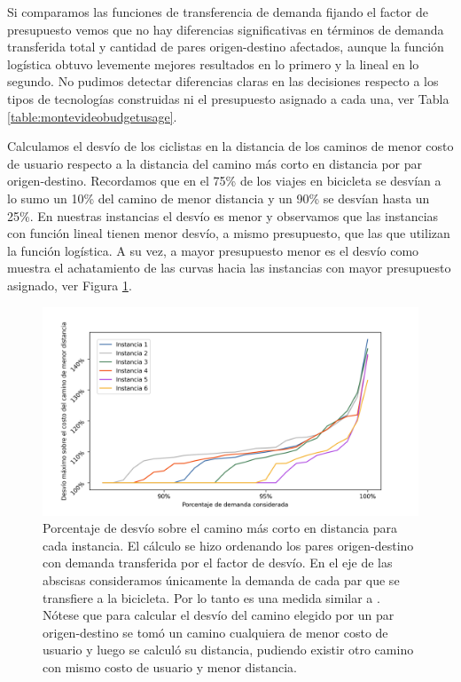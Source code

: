 \FloatBarrier
Si comparamos las funciones de transferencia de demanda fijando el factor de presupuesto vemos que no hay diferencias significativas en términos de demanda transferida total y cantidad de pares origen-destino afectados, aunque la función logística obtuvo levemente mejores resultados en lo primero y la lineal en lo segundo. No pudimos detectar diferencias claras en las decisiones respecto a los tipos de tecnologías construidas ni el presupuesto asignado a cada una, ver Tabla \ref{table:montevideobudgetusage}.

Calculamos el desvío de los ciclistas en la distancia de los caminos de menor costo de usuario respecto a la distancia del camino más corto en distancia por par origen-destino. Recordamos que en \textcite{winters2010} el 75\% de los viajes en bicicleta se desvían a lo sumo un 10\% del camino de menor distancia y un 90\% se desvían hasta un 25\%. En nuestras instancias el desvío es menor y observamos que las instancias con función lineal tienen menor desvío, a mismo presupuesto, que las que utilizan la función logística. A su vez, a mayor presupuesto menor es el desvío como muestra el achatamiento de las curvas hacia las instancias con mayor presupuesto asignado, ver Figura \ref{fig:montevideoshortestpathdeviation}.

\begin{figure}[h!]
  \centering
  \includegraphics[width=\linewidth]{../resources/montevideo_shortest_path_distance_deviation.png}
    \caption{Porcentaje de desvío sobre el camino más corto en distancia para cada instancia. El cálculo se hizo ordenando los pares origen-destino con demanda transferida por el factor de desvío. En el eje de las abscisas consideramos únicamente la demanda de cada par que se transfiere a la bicicleta. Por lo tanto es una medida similar a \textcite{winters2010}. Nótese que para calcular el desvío del camino elegido por un par origen-destino se tomó un camino cualquiera de menor costo de usuario y luego se calculó su distancia, pudiendo existir otro camino con mismo costo de usuario y menor distancia.}
  \label{fig:montevideoshortestpathdeviation}
\end{figure}

